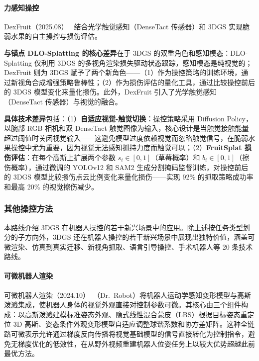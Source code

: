 \paragraph{力感知操控}

DexFruit（2025.08）~\cite{2508_07118} 结合光学触觉感知（DenseTact 传感器）和 3DGS 实现脆弱水果的自主操控与损伤评估。

\textbf{与锚点 DLO-Splatting 的核心差异}在于 3DGS 的双重角色和感知模态：DLO-Splatting 仅利用 3DGS 的多视角渲染损失驱动状态跟踪，感知模态是纯视觉的；DexFruit 则为 3DGS 赋予了两个新角色——（1）作为操控策略的训练环境，通过新视角合成增强策略鲁棒性；（2）作为损伤评估的量化工具，通过比较操控前后的 3DGS 模型变化来量化擦伤。此外，DexFruit 引入了光学触觉感知（DenseTact 传感器）与视觉的融合。

\textbf{具体技术差异}包括：（1）\textbf{自适应视觉-触觉切换}：操控策略采用 Diffusion Policy，以腕部 RGB 相机和双 DenseTact 触觉图像为输入，核心设计是当触觉接触能量超过阈值时关闭视觉输入——这避免模型过度依赖视觉而忽略触觉信号，在脆弱水果操控中尤为重要，因为视觉无法感知抓持力度而触觉可以；（2）\textbf{FruitSplat 损伤评估}：在每个高斯上扩展两个参数 $s_i \in [0,1]$（草莓概率）和 $b_i \in [0,1]$（擦伤概率），通过微调的 YOLOv12 和 SAM2 生成分割掩码监督训练，对操控前后的 3DGS 模型比较擦伤点云比例变化来量化损伤——实现 92\% 的抓取策略成功率和最高 20\% 的视觉擦伤减少。

\subsubsection{其他操控方法}

本路线介绍 3DGS 在机器人操控的若干新兴场景中的应用。除上述按任务类型划分的子方向外，3DGS 还在机器人操控的若干新兴场景中展现出独特价值，涵盖可微渲染、仿真到真实迁移、新视角抓取、语言引导操控、手术机器人等 20 条技术路线。

\paragraph{可微机器人渲染}

可微机器人渲染（2024.10）~\cite{2410_13851}（Dr.\ Robot）将机器人运动学感知变形模型与高斯泼溅集成，使机器人身体的视觉外观直接对控制参数可微。其核心由三个组件构成：以高斯泼溅建模标准姿态外观、隐式线性混合蒙皮（LBS）根据目标姿态重定位 3D 高斯、姿态条件外观变形模型自适应调整球谐系数和协方差矩阵。这种全链路可微表示允许通过梯度反向传播将视觉基础模型的信号直接转化为控制指令，避免无梯度优化的低效性，在从野外视频重建机器人位姿任务上以较大优势超越此前最优方法。

